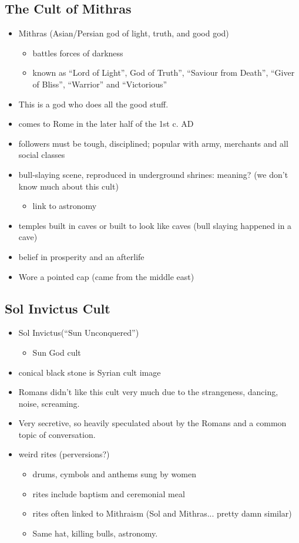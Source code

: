 \documentclass[12pt, twoside]{article}
\begin{document}
\subsection{The Cult of Mithras}
\begin{itemize}
\item Mithras (Asian/Persian god of light, truth, and good god)
	\begin{itemize}
	\item battles forces of darkness
	\item known as “Lord of Light”, God of Truth”, “Saviour from Death”, “Giver of Bliss”, “Warrior” and “Victorious”
	\end{itemize}
\item This is a god who does all the good stuff.
\item comes to Rome in the later half of the 1st c. AD
\item followers must be tough, disciplined; popular with army, merchants and all social classes
\item bull-slaying scene, reproduced in underground shrines: meaning? (we don't know much about this cult)
	\begin{itemize}
	\item link to astronomy
	\end{itemize}
\item temples built in caves or built to look like caves (bull slaying happened in a cave)
\item belief in prosperity and an afterlife
\item Wore a pointed cap (came from the middle east)
\end{itemize}

\subsection{Sol Invictus Cult} 
\begin{itemize}
\item Sol Invictus(“Sun Unconquered”)
	\begin{itemize}
	\item Sun God cult
	\end{itemize}
\item conical black stone is Syrian cult image
\item Romans didn't like this cult very much due to the strangeness, dancing, noise, screaming.
\item Very secretive, so heavily speculated about by the Romans and a common topic of conversation.
\item weird rites (perversions?)
	\begin{itemize}
	\item drums, cymbols and anthems sung by women
	\item rites include baptism and ceremonial meal
	\item rites often linked to Mithraism (Sol and Mithras... pretty damn similar)
	\item Same hat, killing bulls, astronomy.
	\end{itemize}
\end{itemize}
\end{document}
